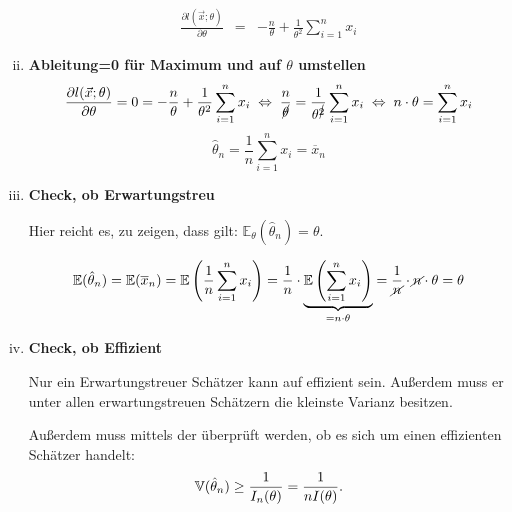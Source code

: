 \begin{uebsp}
\begin{Answer}
\begin{enumerate}[i)]
\begin{eqnarray*}
            \frac{\partial l(\vec x;\theta)}{\partial\theta}&=&-\frac{n}{\theta} +\frac{1}{\theta^2}\sum_{i=1}^{n}x_i
        \end{eqnarray*}
    \item \textbf{Ableitung=0 für Maximum und auf $\theta$ umstellen}
        \[\frac{\partial l(\vec x;\theta)}{\partial\theta}=0=-\frac{n}{\theta} +\frac{1}{\theta^2}\sum_{i=1}^{n}x_i\;\Leftrightarrow\;\frac{n}{\cancel\theta}=\frac{1}{\theta^{\cancel{2}}}\sum_{i=1}^nx_i\;\Leftrightarrow\;n\cdot \theta=\sum_{i=1}^nx_i\]
        \[\hat\theta_n=\frac{1}{n}\sum_{i=1}^nx_i=\overline x_n\]
    \item \textbf{Check, ob Erwartungstreu}
        \begin{uebsp_theory}
            Hier reicht es, zu zeigen, dass gilt: $\mathbb{E}_\theta(\hat\theta_n)=\theta.$ 
        \end{uebsp_theory}
        \[\mathbb{E}(\hat\theta_n)=\mathbb{E}(\overline x_n)=\mathbb{E}\left(\frac{1}{n}\sum_{i=1}^nx_i\right)=\frac{1}{n}\cdot\underbrace{\mathbb{E}\left(\sum_{i=1}^nx_i\right)}_{=n\cdot\theta}=\frac{1}{\cancel n}\cdot \cancel n\cdot \theta=\theta\]
    \item \textbf{Check, ob Effizient}
        \begin{uebsp_theory}
            Nur ein Erwartungstreuer Schätzer kann auf effizient sein. Außerdem muss er unter allen erwartungstreuen Schätzern die kleinste Varianz besitzen.

            Außerdem muss mittels der  überprüft werden, ob es sich um einen effizienten Schätzer handelt:
            \[\mathbb V(\hat\theta_n)\ge {1\over I_n(\theta)}={1\over nI(\theta)}.\]


\end{uebsp_theory}
\end{enumerate}
\end{Answer}
\end{uebsp}
